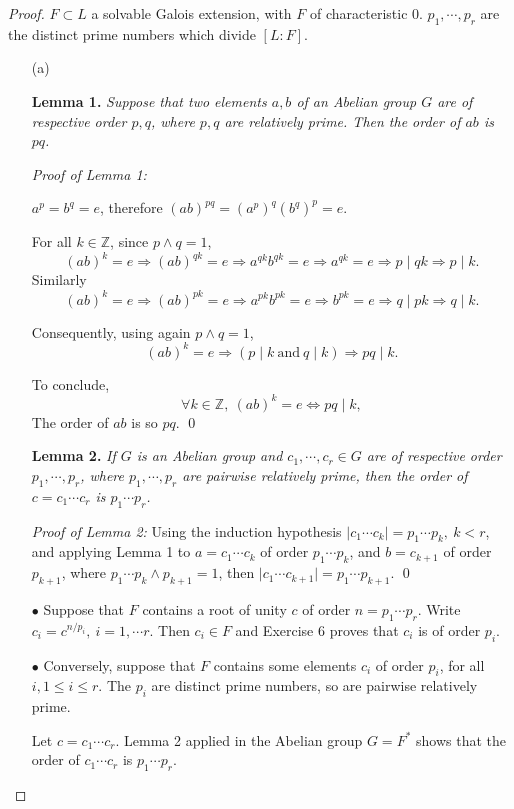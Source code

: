 \documentclass[11pt,a4paper]{article}
\newcommand{\Z}{\mathbb{Z}}
\begin{document}
\begin{proof}
$F\subset L $ a solvable Galois extension, with $F$ of characteristic 0. $p_1,\cdots,p_r$ are the distinct prime numbers which divide $[L:F]$.
\begin{enumerate}
\item[(a)]

{\bf Lemma 1.} {\it Suppose that two elements $a,b$ of an Abelian group $G$ are of respective order $p,q$, where $p,q$ are relatively prime. Then the order of $ab$ is $pq$. }

{\it Proof of Lemma 1:} 

$a^p= b^q=e$, therefore $(ab)^{pq} = (a^p)^q (b^q)^p = e$.

For all $k\in \Z$,  since $p \wedge q = 1$,
$$(ab)^k = e \Rightarrow (ab)^{qk} = e\Rightarrow a^{qk} b^{qk}=e \Rightarrow a^{qk} = e \Rightarrow p \mid qk \Rightarrow p \mid k.$$
Similarly
$$(ab)^k = e \Rightarrow (ab)^{pk} = e\Rightarrow a^{pk} b^{pk}=e \Rightarrow b^{pk} = e \Rightarrow q \mid pk \Rightarrow q \mid k.$$

Consequently, using again $p\wedge q = 1$, $$(ab)^k = e \Rightarrow (p \mid k \ \mathrm{and} \ q \mid k) \Rightarrow pq\mid  k.$$

To conclude, 
$$\forall k \in \Z,\ (ab)^k=e \iff pq \mid k,$$
The order of $ab$ is so $pq$. \qed 

\bigskip 
{\bf Lemma 2.} {\it If $G$ is an Abelian group and $c_1, \cdots,c_r \in G$ are of respective order $p_1, \cdots, p_r$, where $p_1, \cdots,p_r$ are pairwise relatively prime, then the order of $c = c_1\cdots c_r$ is $p_1\cdots p_r$.}

{\it Proof of Lemma 2:}   Using the induction hypothesis $\vert c_1\cdots c_k \vert = p_1\cdots p_k, \ k<r$, and applying Lemma 1 to $a=c_1\cdots c_k$ of order  $p_1\cdots p_k$, and $b = c_{k+1}$ of order $p_{k+1}$, where $p_1\cdots p_k \wedge p_{k+1}=1$, then $\vert c_1\cdots c_{k+1} \vert  = p_1\cdots p_{k+1}$. \qed

$\bullet$ Suppose that $F$ contains a root of unity $c$ of order $n = p_1\cdots p_r$. Write $c_i = c^{n/p_i},\ i=1,\cdots r$. Then $c_i\in F$ and Exercise 6 proves that $c_i$ is of order $p_i$.

$\bullet$ Conversely, suppose that $F$ contains some elements $c_i$ of order $p_i$, for all $i, 1\leq i \leq r$. The $p_i$ are distinct prime numbers, so are pairwise relatively prime.

Let $c = c_1\cdots c_r$. Lemma 2 applied in the Abelian group $G = F^*$ shows that the order of $c_1\cdots c_r$ is $p_1\cdots p_r$.


\end{enumerate}
\end{proof}
\end{document}
